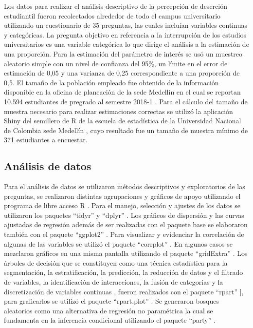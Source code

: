 \documentclass[]{article}
\begin{document}
Los datos para realizar el análisis descriptivo de la percepción de
deserción estudiantil fueron recolectados alrededor de todo el campus
universitario utilizando un cuestionario de 35 preguntas, las cuales
incluían variables continuas y categóricas. La pregunta objetivo en
referencia a la interrupción de los estudios universitarios es una
variable categórica lo que dirige el análisis a la estimación de una
proporción. Para la estimación del parámetro de interés se usó un
muestreo aleatorio simple con un nivel de confianza del 95\%, un límite
en el error de estimación de 0,05 y una varianza de 0,25 correspondiente
a una proporción de 0,5. El tamaño de la población empleado fue obtenido
de la información disponible en la oficina de planeación de la sede
Medellín en el cual se reportan 10.594 estudiantes de pregrado al
semestre 2018-1
\citep{UniversidadNacionaldeColombiaSedeMedellin.OficinadePlaneacion2018}.
Para el cálculo del tamaño de muestra necesario para realizar
estimaciones correctas se utilizó la aplicación Shiny del semillero de R
de la escuela de estadística de la Universidad Nacional de Colombia sede
Medellín \citep{SemillerodeR.EscueladeEstadistica2019}, cuyo resultado
fue un tamaño de muestra mínimo de 371 estudiantes a encuestar.

\hypertarget{analisis-de-datos}{%
\subsection{Análisis de datos}\label{analisis-de-datos}}

Para el análisis de datos se utilizaron métodos descriptivos y
exploratorios de las preguntas, se realizaron distintas agrupaciones y
gráficos de apoyo utilizando el programa de libre acceso R \citep{R}.
Para el manejo, selección y ajustes de los datos se utilizaron los
paquetes ``tidyr'' \citep{Wickham2019a} y ``dplyr'' \citep{Wickham2019}.
Los gráficos de dispersión y las curvas ajustadas de regresión además de
ser realizadas con el paquete base se elaboraron también con el paquete
``ggplot2'' \citep{Wickham2016}. Para visualizar y evidenciar la
correlación de algunas de las variables se utilizó el paquete
``corrplot'' \citep{Wei2017}. En algunos casos se mezclaron gráficos en
una misma pantalla utilizando el paquete ``gridExtra''
\citep{Auguie2017}. Los árboles de decisión que se constituyen como una
técnica estadística para la segmentación, la estratificación, la
predicción, la reducción de datos y el filtrado de variables, la
identificación de interacciones, la fusión de categorías y la
discretización de variables continuas \citep{BerlangaSilvente2013},
fueron realizados con el paquete ``rpart'' \citep{Therneau2019}{]}, para
graficarlos se utilizó el paquete ``rpart.plot'' \citep{Milborrow2019}.
Se generaron bosques aleatorios como una alternativa de regresión no
paramétrica la cual se fundamenta en la inferencia condicional
utilizando el paquete ``party'' \citep{Hothorn2019}.
\end{document}
